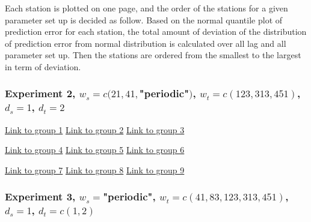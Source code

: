 Each station is plotted on one page, and the order of the stations for a given 
parameter set up is decided as follow. Based on the normal quantile plot of 
prediction error for each station, the total amount of deviation of the distribution 
of prediction error from normal distribution is calculated over all lag and all 
parameter set up. Then the stations are ordered from the smallest to the largest 
in term of deviation.


\subsubsection{Experiment 2,  
\textmd{$w_s=c(21, 41, $"periodic"$)$, $w_t=c(123, 313, 451)$, $d_s=1$, $d_t=2$}
}

\begin{framed}
\begin{center}
  \href{../plots/a1950/E2/QQ.error.tmax.group.1.pdf}{Link to group 1} 
  \;\;\;\;\;\;\;\;\;\;
  \href{../plots/a1950/E2/QQ.error.tmax.group.2.pdf}{Link to group 2} 
  \;\;\;\;\;\;\;\;\;\;
  \href{../plots/a1950/E2/QQ.error.tmax.group.3.pdf}{Link to group 3}
\end{center}
\begin{center}
  \href{../plots/a1950/E2/QQ.error.tmax.group.4.pdf}{Link to group 4} 
  \;\;\;\;\;\;\;\;\;\;
  \href{../plots/a1950/E2/QQ.error.tmax.group.5.pdf}{Link to group 5} 
  \;\;\;\;\;\;\;\;\;\;
  \href{../plots/a1950/E2/QQ.error.tmax.group.6.pdf}{Link to group 6}
\end{center}
\begin{center}
  \href{../plots/a1950/E2/QQ.error.tmax.group.7.pdf}{Link to group 7} 
  \;\;\;\;\;\;\;\;\;\;
  \href{../plots/a1950/E2/QQ.error.tmax.group.8.pdf}{Link to group 8} 
  \;\;\;\;\;\;\;\;\;\;
  \href{../plots/a1950/E2/QQ.error.tmax.group.9.pdf}{Link to group 9}
  \label{QQ.error.laggroup}
\end{center}
\end{framed}

\subsubsection{Experiment 3,  
\textmd{$w_s=$"periodic", $w_t=c(41, 83, 123, 313, 451)$, $d_s=1$, $d_t=c(1,2)$}
}


